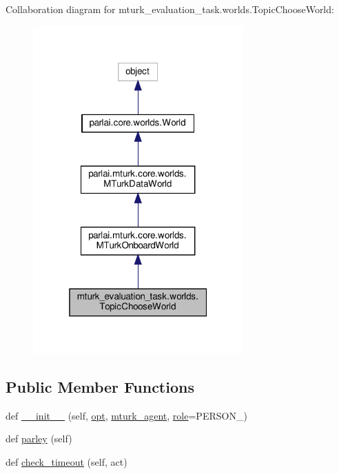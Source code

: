 Collaboration diagram for mturk\+\_\+evaluation\+\_\+task.\+worlds.\+Topic\+Choose\+World\+:
\nopagebreak
\begin{figure}[H]
\begin{center}
\leavevmode
\includegraphics[width=229pt]{classmturk__evaluation__task_1_1worlds_1_1TopicChooseWorld__coll__graph}
\end{center}
\end{figure}
\subsection*{Public Member Functions}
\begin{DoxyCompactItemize}
\item 
def \hyperlink{classmturk__evaluation__task_1_1worlds_1_1TopicChooseWorld_a9e06ee83119626b530d5408b9f232457}{\+\_\+\+\_\+init\+\_\+\+\_\+} (self, \hyperlink{classparlai_1_1core_1_1worlds_1_1World_a3640d92718acd3e6942a28c1ab3678bd}{opt}, \hyperlink{classparlai_1_1mturk_1_1core_1_1worlds_1_1MTurkOnboardWorld_a38d19c84f42e452f782df53df4fb9861}{mturk\+\_\+agent}, \hyperlink{classmturk__evaluation__task_1_1worlds_1_1TopicChooseWorld_ae4b2f15304f19e802dad4191efb79184}{role}=\textquotesingle{}P\+E\+R\+S\+O\+N\+\_\textquotesingle{})
\item 
def \hyperlink{classmturk__evaluation__task_1_1worlds_1_1TopicChooseWorld_ad31279b796eee33dd196a4f0990a3969}{parley} (self)
\item 
def \hyperlink{classmturk__evaluation__task_1_1worlds_1_1TopicChooseWorld_ae2708ee0f525591f4d8f3a8028534687}{check\+\_\+timeout} (self, act)
\end{DoxyCompactItemize}
